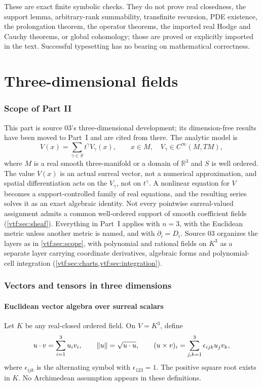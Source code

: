 \documentclass[11pt,letterpaper]{article}
\theoremstyle{definition}
\theoremstyle{remark}
\newcommand{\R}{\mathbb R}\newcommand{\C}{\mathbb C}
\begin{document}
These are exact finite symbolic checks. They do not prove real closedness, the
support lemma, arbitrary-rank summability, transfinite recursion, PDE existence,
the prolongation theorem, the operator theorems, the imported real Hodge and
Cauchy theorems, or global cohomology; those are proved or explicitly imported
in the text. Successful typesetting has no bearing on mathematical correctness.

\part{Three-dimensional fields}\label{vtf:part:3d}

\section{Scope of Part II}\label{vtf:3d:sec:scope}

This part is source 03's three-dimensional development; its dimension-free
results have been moved to Part~I and are cited from there. The analytic model
is
\begin{equation}\label{vtf:3d:eq:central}
 V(x)=\sum_{\gamma\in S}t^\gamma V_\gamma(x),\qquad
 x\in M,\quad V_\gamma\in C^\infty(M,TM),
\end{equation}
where $M$ is a real smooth three-manifold or a domain of $\R^3$ and $S$ is well
ordered. The value $V(x)$ is an actual surreal vector, not a numerical
approximation, and spatial differentiation acts on the $V_\gamma$, not on
$t^\gamma$. A nonlinear equation for $V$ becomes a support-controlled family of
real equations, and the resulting series solves it as an exact algebraic
identity. Not every pointwise surreal-valued assignment admits a common
well-ordered support of smooth coefficient fields (\cref{vtf:sec:sheaf}).
Everything in Part~I applies with $n=3$, with the Euclidean metric unless
another metric is named, and with $\partial_i=D_i$. Source 03 organizes the
layers as in \cref{vtf:sec:scope}, with polynomial and rational fields on $K^3$
as a separate layer carrying coordinate derivatives, algebraic forms and
polynomial-cell integration (\cref{vtf:sec:charts,vtf:sec:integration}).

\section{Vectors and tensors in three dimensions}\label{vtf:3d:sec:algebra}
\subsection{Euclidean vector algebra over surreal scalars}
Let $K$ be any real-closed ordered field. On $V=K^3$, define
\[
 u\cdot v=\sum_{i=1}^3u_iv_i,\qquad
 \lVert u\rVert=\sqrt{u\cdot u},\qquad
 (u\times v)_i=\sum_{j,k=1}^3\epsilon_{ijk}u_jv_k,
\]
where $\epsilon_{ijk}$ is the alternating symbol with $\epsilon_{123}=1$.
The positive square root exists in $K$. No Archimedean assumption appears in these definitions.
\end{document}
